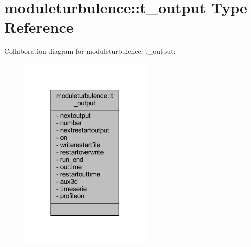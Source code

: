 \hypertarget{structmoduleturbulence_1_1t__output}{}\section{moduleturbulence\+:\+:t\+\_\+output Type Reference}
\label{structmoduleturbulence_1_1t__output}


Collaboration diagram for moduleturbulence\+:\+:t\+\_\+output\+:\nopagebreak
\begin{figure}[H]
\begin{center}
\leavevmode
\includegraphics[width=182pt]{structmoduleturbulence_1_1t__output__coll__graph}
\end{center}
\end{figure}
